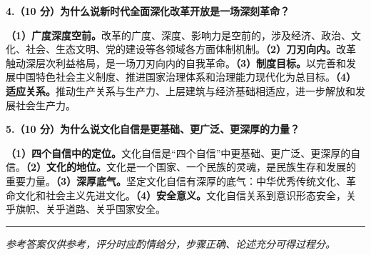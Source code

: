 \documentclass[12pt, a4paper]{article}
\newcommand{\examrule}{\noindent\rule{\linewidth}{0.6pt}}
\begin{document}
\noindent\textbf{4.（10 分）为什么说新时代全面深化改革开放是一场深刻革命？}
\begin{answerbox}
\textbf{（1）广度深度空前。}改革的广度、深度、影响力是空前的，涉及经济、政治、文化、社会、生态文明、党的建设等各领域各方面体制机制。\textbf{（2）刀刃向内。}改革触动深层次利益格局，是一场刀刃向内的自我革命。\textbf{（3）制度目标。}以完善和发展中国特色社会主义制度、推进国家治理体系和治理能力现代化为总目标。\textbf{（4）适应关系。}推动生产关系与生产力、上层建筑与经济基础相适应，进一步解放和发展社会生产力。
\end{answerbox}
\vspace{6pt}

\noindent\textbf{5.（10 分）为什么说文化自信是更基础、更广泛、更深厚的力量？}
\begin{answerbox}
\textbf{（1）四个自信中的定位。}文化自信是``四个自信''中更基础、更广泛、更深厚的自信。\textbf{（2）文化的地位。}文化是一个国家、一个民族的灵魂，是民族生存和发展的重要力量。\textbf{（3）深厚底气。}坚定文化自信有深厚的底气：中华优秀传统文化、革命文化和社会主义先进文化。\textbf{（4）安全意义。}文化自信关系到意识形态安全，关乎旗帜、关乎道路、关乎国家安全。
\end{answerbox}
\vspace{12pt}
\examrule
\begin{center}
  \textit{参考答案仅供参考，评分时应酌情给分，步骤正确、论述充分可得过程分。}
\end{center}
\end{document}
